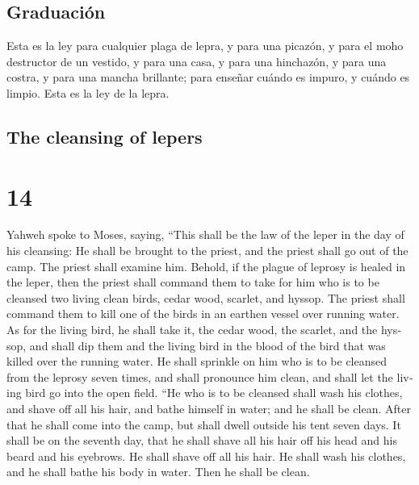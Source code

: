 \begin{paracol}{2}
\hypertarget{graduaciuxf3n}{%
\subsection{Graduación}\label{graduaciuxf3n}}

 Esta es la ley para cualquier plaga de lepra, y para una
picazón,  y para el moho destructor de un vestido, y para
una casa,  y para una hinchazón, y para una costra, y
para una mancha brillante;  para enseñar cuándo es
impuro, y cuándo es limpio. Esta es la ley de la lepra.

\switchcolumn
\begin{otherlanguage}{english}

\hypertarget{the-cleansing-of-lepers}{%
\subsection{The cleansing of lepers}\label{the-cleansing-of-lepers}}

\hypertarget{section-27}{%
\section{14}\label{section-27}}

 Yahweh spoke to Moses, saying,  ``This
shall be the law of the leper in the day of his cleansing: He shall be
brought to the priest,  and the priest shall go out of the
camp. The priest shall examine him. Behold, if the plague of leprosy is
healed in the leper,  then the priest shall command them
to take for him who is to be cleansed two living clean birds, cedar
wood, scarlet, and hyssop.  The priest shall command them
to kill one of the birds in an earthen vessel over running water.
 As for the living bird, he shall take it, the cedar wood,
the scarlet, and the hyssop, and shall dip them and the living bird in
the blood of the bird that was killed over the running water.
 He shall sprinkle on him who is to be cleansed from the
leprosy seven times, and shall pronounce him clean, and shall let the
living bird go into the open field.  ``He who is to be
cleansed shall wash his clothes, and shave off all his hair, and bathe
himself in water; and he shall be clean. After that he shall come into
the camp, but shall dwell outside his tent seven days.  It
shall be on the seventh day, that he shall shave all his hair off his
head and his beard and his eyebrows. He shall shave off all his hair. He
shall wash his clothes, and he shall bathe his body in water. Then he
shall be clean.


\end{otherlanguage}
\end{paracol}
